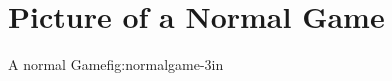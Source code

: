 \section{Picture of a Normal Game}
\label{label:normalgame}
			{A normal Game}{fig:normalgame}{-3in}		